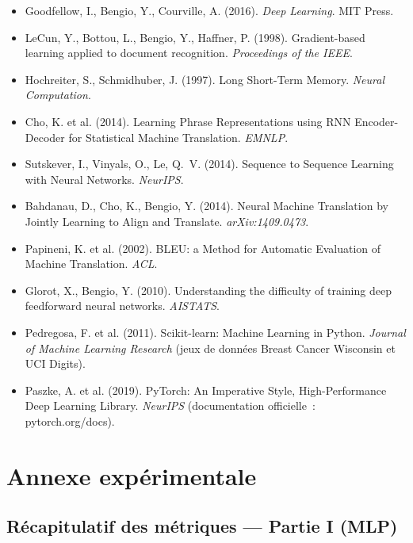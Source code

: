 \documentclass[11pt,a4paper]{article}
\begin{document}
\begin{itemize}[leftmargin=1.2cm]
\item Goodfellow, I., Bengio, Y., Courville, A. (2016). \textit{Deep Learning}. MIT Press.
\item LeCun, Y., Bottou, L., Bengio, Y., Haffner, P. (1998). Gradient-based learning applied to document recognition. \textit{Proceedings of the IEEE}.
\item Hochreiter, S., Schmidhuber, J. (1997). Long Short-Term Memory. \textit{Neural Computation}.
\item Cho, K. et al. (2014). Learning Phrase Representations using RNN Encoder-Decoder for Statistical Machine Translation. \textit{EMNLP}.
\item Sutskever, I., Vinyals, O., Le, Q.~V. (2014). Sequence to Sequence Learning with Neural Networks. \textit{NeurIPS}.
\item Bahdanau, D., Cho, K., Bengio, Y. (2014). Neural Machine Translation by Jointly Learning to Align and Translate. \textit{arXiv:1409.0473}.
\item Papineni, K. et al. (2002). BLEU: a Method for Automatic Evaluation of Machine Translation. \textit{ACL}.
\item Glorot, X., Bengio, Y. (2010). Understanding the difficulty of training deep feedforward neural networks. \textit{AISTATS}.
\item Pedregosa, F. et al. (2011). Scikit-learn: Machine Learning in Python. \textit{Journal of Machine Learning Research} (jeux de données Breast Cancer Wisconsin et UCI Digits).
\item Paszke, A. et al. (2019). PyTorch: An Imperative Style, High-Performance Deep Learning Library. \textit{NeurIPS} (documentation officielle~: pytorch.org/docs).
\end{itemize}

\newpage
\section*{Annexe expérimentale}
\renewcommand{\thesubsection}{A.\arabic{subsection}}
\setcounter{subsection}{0}

\subsection{Récapitulatif des métriques --- Partie I (MLP)}
\end{document}
